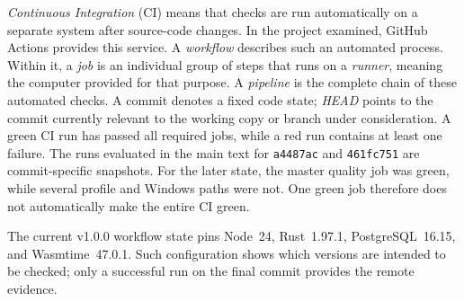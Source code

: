 \begin{beginnerstatement}

\emph{Continuous Integration} (CI) means that checks are run automatically on
a separate system after source-code changes. In the project examined, GitHub
Actions provides this service. A \emph{workflow} describes such an automated
process. Within it, a \emph{job} is an individual group of steps that runs on
a \emph{runner}, meaning the computer provided for that purpose. A
\emph{pipeline} is the complete chain of these automated checks. A commit
denotes a fixed code state; \emph{HEAD} points to the commit currently relevant
to the working copy or branch under consideration. A green CI run has passed
all required jobs, while a red run contains at least one failure. The runs
evaluated in the main text for \texttt{a4487ac} and \texttt{461fc751} are
commit-specific snapshots. For the later state, the master quality job was
green, while several profile and Windows paths were not. One green job
therefore does not automatically make the entire CI green.

The current v1.0.0 workflow state pins Node~24, Rust~1.97.1,
PostgreSQL~16.15, and Wasmtime~47.0.1. Such configuration shows which versions
are intended to be checked; only a successful run on the final commit provides
the remote evidence.

\end{beginnerstatement}
